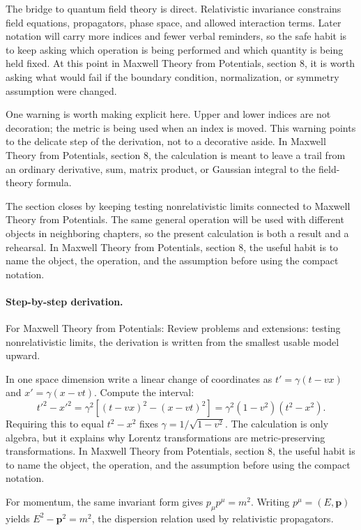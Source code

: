 The bridge to quantum field theory is direct.  Relativistic invariance constrains field equations, propagators, phase space, and allowed interaction terms.  Later notation will carry more indices and fewer verbal reminders, so the safe habit is to keep asking which operation is being performed and which quantity is being held fixed.  At this point in Maxwell Theory from Potentials, section 8, it is worth asking what would fail if the boundary condition, normalization, or symmetry assumption were changed.

One warning is worth making explicit here.  Upper and lower indices are not decoration; the metric is being used when an index is moved.  This warning points to the delicate step of the derivation, not to a decorative aside.  In Maxwell Theory from Potentials, section 8, the calculation is meant to leave a trail from an ordinary derivative, sum, matrix product, or Gaussian integral to the field-theory formula.

The section closes by keeping testing nonrelativistic limits connected to Maxwell Theory from Potentials.  The same general operation will be used with different objects in neighboring chapters, so the present calculation is both a result and a rehearsal.  In Maxwell Theory from Potentials, section 8, the useful habit is to name the object, the operation, and the assumption before using the compact notation.



\paragraph{Step-by-step derivation.}

For Maxwell Theory from Potentials: Review problems and extensions: testing nonrelativistic limits, the derivation is written from the smallest usable model upward.

In one space dimension write a linear change of coordinates as \(t'=\gamma(t-vx)\) and \(x'=\gamma(x-vt)\).  Compute the interval:
\[
  t'^2-x'^2
  =
  \gamma^2[(t-vx)^2-(x-vt)^2]
  =
  \gamma^2(1-v^2)(t^2-x^2).
\]
Requiring this to equal \(t^2-x^2\) fixes \(\gamma=1/\sqrt{1-v^2}\).  The calculation is only algebra, but it explains why Lorentz transformations are metric-preserving transformations.  In Maxwell Theory from Potentials, section 8, the useful habit is to name the object, the operation, and the assumption before using the compact notation.

For momentum, the same invariant form gives \(p_\mu p^\mu=m^2\).  Writing \(p^\mu=(E,\bm p)\) yields \(E^2-\bm p^2=m^2\), the dispersion relation used by relativistic propagators.

